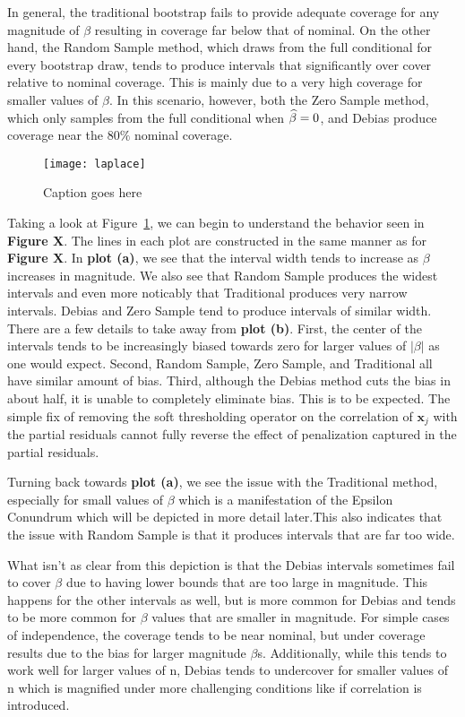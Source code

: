 In general, the traditional bootstrap fails to provide adequate coverage for any magnitude of $\beta$ resulting in coverage far below that of nominal. On the other hand, the Random Sample method, which draws from the full conditional for every bootstrap draw, tends to produce intervals that significantly over cover relative to nominal coverage. This is mainly due to a very high coverage for smaller values of $\beta$. In this scenario, however, both the Zero Sample method, which only samples from the full conditional when $\widehat{\beta} = 0$, and Debias produce coverage near the $80\%$ nominal coverage.

\begin{figure}
  \texttt{[image: laplace]}
  \caption{\label{Fig:laplace} Caption goes here}
\end{figure}

Taking a look at Figure~\ref{Fig:laplace}, we can begin to understand the behavior seen in \textbf{Figure X}. The lines in each plot are constructed in the same manner as for \textbf{Figure X}. In \textbf{plot (a)}, we see that the interval width tends to increase as $\beta$ increases in magnitude. We also see that Random Sample produces the widest intervals and even more noticably that Traditional produces very narrow intervals. Debias and Zero Sample tend to produce intervals of similar width. There are a few details to take away from \textbf{plot (b)}. First, the center of the intervals tends to be increasingly biased towards zero for larger values of $|\beta|$ as one would expect. Second, Random Sample, Zero Sample, and Traditional all have similar amount of bias. Third, although the Debias method cuts the bias in about half, it is unable to completely eliminate bias. This is to be expected. The simple fix of removing the soft thresholding operator on the correlation of $\boldsymbol{x}_j$ with the partial residuals cannot fully reverse the effect of penalization captured in the partial residuals.

Turning back towards \textbf{plot (a)}, we see the issue with the Traditional method, especially for small values of $\beta$ which is a manifestation of the Epsilon Conundrum which will be depicted in more detail later.This also indicates that the issue with Random Sample is that it produces intervals that are far too wide.

What isn't as clear from this depiction is that the Debias intervals sometimes fail to cover $\beta$ due to having lower bounds that are too large in magnitude. This happens for the other intervals as well, but is more common for Debias and tends to be more common for $\beta$ values that are smaller in magnitude. For simple cases of independence, the coverage tends to be near nominal, but under coverage results due to the bias for larger magnitude $\beta$s. Additionally, while this tends to work well for larger values of n, Debias tends to undercover for smaller values of n which is magnified under more challenging conditions like if correlation is introduced.



